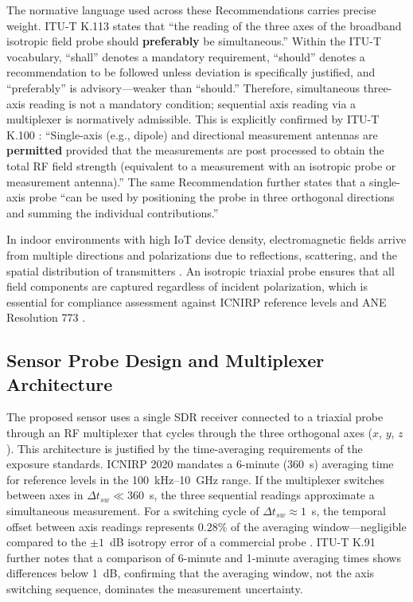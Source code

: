 \documentclass[11pt,a4paper]{article}
\begin{document}
\noindent The normative language used across these Recommendations carries precise weight. ITU-T K.113 \cite{itut_k113} states that ``the reading of the three axes of the broadband isotropic field probe should \textbf{preferably} be simultaneous.'' Within the ITU-T vocabulary, ``shall'' denotes a mandatory requirement, ``should'' denotes a recommendation to be followed unless deviation is specifically justified, and ``preferably'' is advisory---weaker than ``should.'' Therefore, simultaneous three-axis reading is not a mandatory condition; sequential axis reading via a multiplexer is normatively admissible. This is explicitly confirmed by ITU-T K.100 \cite{itut_k100}: ``Single-axis (e.g., dipole) and directional measurement antennas are \textbf{permitted} provided that the measurements are post processed to obtain the total RF field strength (equivalent to a measurement with an isotropic probe or measurement antenna).'' The same Recommendation further states that a single-axis probe ``can be used by positioning the probe in three orthogonal directions and summing the individual contributions.''

In indoor environments with high IoT device density, electromagnetic fields arrive from multiple directions and polarizations due to reflections, scattering, and the spatial distribution of transmitters \cite{itut_k91}. An isotropic triaxial probe ensures that all field components are captured regardless of incident polarization, which is essential for compliance assessment against ICNIRP reference levels \cite{icnirp2020} and ANE Resolution 773 \cite{ane_res773_2023}.

\subsection{Sensor Probe Design and Multiplexer Architecture}

The proposed sensor uses a single SDR receiver connected to a triaxial probe through an RF multiplexer that cycles through the three orthogonal axes ($x$, $y$, $z$). This architecture is justified by the time-averaging requirements of the exposure standards. ICNIRP 2020 \cite{icnirp2020} mandates a 6-minute (360~s) averaging time for reference levels in the 100~kHz--10~GHz range. If the multiplexer switches between axes in $\Delta t_{sw} \ll 360$~s, the three sequential readings approximate a simultaneous measurement. For a switching cycle of $\Delta t_{sw} \approx 1$~s, the temporal offset between axis readings represents $0.28\%$ of the averaging window---negligible compared to the $\pm 1$~dB isotropy error of a commercial probe \cite{martinezgonzalez_2022}. ITU-T K.91 \cite{itut_k91} further notes that a comparison of 6-minute and 1-minute averaging times shows differences below 1~dB, confirming that the averaging window, not the axis switching sequence, dominates the measurement uncertainty.
\end{document}
